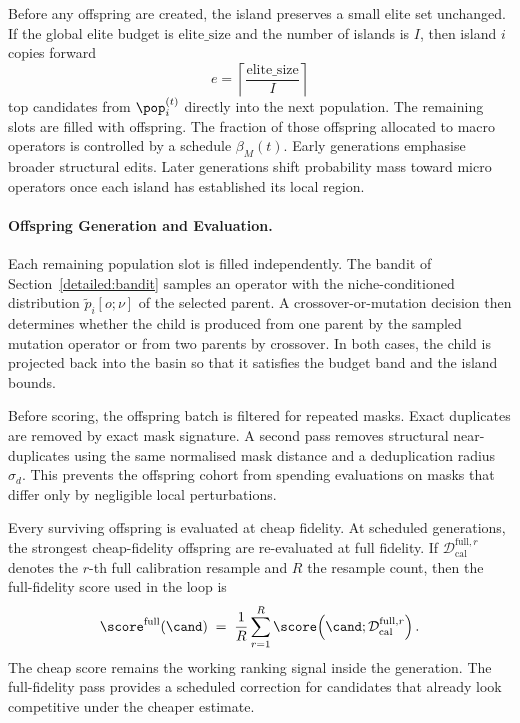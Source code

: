 Before any offspring are created, the island preserves a small elite set unchanged. If the global elite budget is $\mathrm{elite\_size}$ and the number of islands is $I$, then island $i$ copies forward
\[
e = \left\lceil \frac{\mathrm{elite\_size}}{I} \right\rceil
\]
top candidates from $\pop_i^{(t)}$ directly into the next population. The remaining slots are filled with offspring. The fraction of those offspring allocated to macro operators is controlled by a schedule $\beta_M(t)$. Early generations emphasise broader structural edits. Later generations shift probability mass toward micro operators once each island has established its local region.

\paragraph{Offspring Generation and Evaluation.}
Each remaining population slot is filled independently. The bandit of Section~\ref{detailed:bandit} samples an operator with the niche-conditioned distribution $\tilde p_i[o;\nu]$ of the selected parent. A crossover-or-mutation decision then determines whether the child is produced from one parent by the sampled mutation operator or from two parents by crossover. In both cases, the child is projected back into the basin so that it satisfies the budget band and the island bounds.

Before scoring, the offspring batch is filtered for repeated masks. Exact duplicates are removed by exact mask signature. A second pass removes structural near-duplicates using the same normalised mask distance and a deduplication radius $\sigma_d$. This prevents the offspring cohort from spending evaluations on masks that differ only by negligible local perturbations.

Every surviving offspring is evaluated at cheap fidelity. At scheduled generations, the strongest cheap-fidelity offspring are re-evaluated at full fidelity. If $\mathcal{D}_{\mathrm{cal}}^{\mathrm{full},r}$ denotes the $r$-th full calibration resample and $R$ the resample count, then the full-fidelity score used in the loop is
\[
\score^{\mathrm{full}}(\cand)
\;=\;
\frac{1}{R}\sum_{r=1}^{R} \score\!\left(\cand;\mathcal{D}_{\mathrm{cal}}^{\mathrm{full},r}\right).
\]
The cheap score remains the working ranking signal inside the generation. The full-fidelity pass provides a scheduled correction for candidates that already look competitive under the cheaper estimate.

